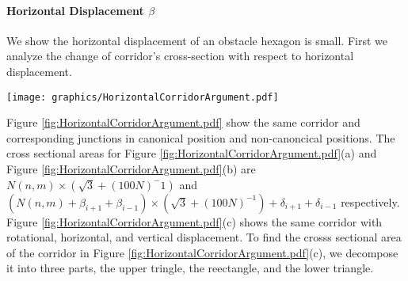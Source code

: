 \paragraph{Horizontal Displacement $\beta$}

We show the horizontal displacement of an obstacle hexagon is small.
First we analyze the change of corridor's cross-section with respect to horizontal displacement.

\begin{minipage}{\linewidth}
\begin{center}
\texttt{[image: graphics/HorizontalCorridorArgument.pdf]}
\label{fig:HorizontalCorridorArgument.pdf}
\end{center}
\end{minipage}

Figure \ref{fig:HorizontalCorridorArgument.pdf} show the same corridor and corresponding junctions in canonical position and non-canoncical positions.  
The cross sectional areas for Figure \ref{fig:HorizontalCorridorArgument.pdf}(a) and Figure \ref{fig:HorizontalCorridorArgument.pdf}(b) are $N(n,m) \times (\sqrt{3} + (100N)^-1)$ and $(N(n,m) + \beta_{i+1} + \beta_{i-1}) \times (\sqrt{3} + (100N)^{-1}) + \delta_{i+1} + \delta_{i-1}$ respectively.  
Figure \ref{fig:HorizontalCorridorArgument.pdf}(c) shows the same corridor with rotational, horizontal, and vertical displacement.
To find the crosss sectional area of the corridor in Figure \ref{fig:HorizontalCorridorArgument.pdf}(c), we decompose it into three parts, the upper tringle, the reectangle, and the lower triangle.  

